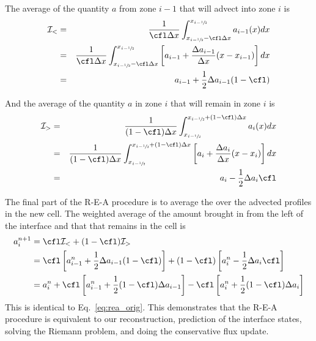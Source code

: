 The average of the quantity $a$ from zone $i-1$ that will advect into
zone $i$ is
\begin{eqnarray}
\mathcal{I}_< &=& \frac{1}{\cfl \Delta x}
   \int_{x_{i-\myhalf} - \cfl\Delta x}^{x_{i-\myhalf}} a_{i-1}(x) dx \\
%
 &=& \frac{1}{\cfl \Delta x}
   \int_{x_{i-\myhalf} - \cfl\Delta x}^{x_{i-\myhalf}}
        \left [ a_{i-1} + \frac{\Delta a_{i-1}}{\Delta x} (x - x_{i-1} ) \right ] dx  \\
 &=& a_{i-1} + \frac{1}{2} \Delta a_{i-1} (1-\cfl)
\end{eqnarray}

And the average of the quantity $a$ in zone $i$ that will remain in zone $i$
is
\begin{eqnarray}
\mathcal{I}_> &=& \frac{1}{(1-\cfl) \Delta x}
   \int_{x_{i-\myhalf}}^{x_{i-\myhalf} + (1-\cfl) \Delta x} a_{i}(x) dx \\
%
 &=& \frac{1}{(1-\cfl) \Delta x}
   \int_{x_{i-\myhalf}}^{x_{i-\myhalf} + (1-\cfl)\Delta x}
        \left [ a_{i} + \frac{\Delta a_{i}}{\Delta x} (x - x_{i} ) \right ] dx  \\
 &=& a_{i} - \frac{1}{2} \Delta a_{i} \cfl
\end{eqnarray}

The final part of the R-E-A procedure is to average the over the
advected profiles in the new cell.  The weighted average of the
amount brought in from the left of the interface and that that remains
in the cell is
\begin{align}
a_i^{n+1} &= \cfl \mathcal{I}_< + (1 - \cfl) \mathcal{I}_>  \\
          &= \cfl \left [ a^n_{i-1} + \frac{1}{2} \Delta a_{i-1} (1 - \cfl) \right ]
   + (1-\cfl) \left [ a^n_i - \frac{1}{2} \Delta a_i \cfl \right ] \\
          &= a^n_i + \cfl \left [a^n_{i-1} + \frac{1}{2}(1 - \cfl) \Delta a_{i-1} \right ]
           - \cfl \left [ a^n_i + \frac{1}{2} (1-\cfl) \Delta a_i \right ]
\end{align}
This is identical to Eq.~\ref{eq:rea_orig}.  This demonstrates that the
R-E-A procedure is equivalent to our reconstruction, prediction of the
interface states, solving the Riemann problem, and doing the
conservative flux update.


